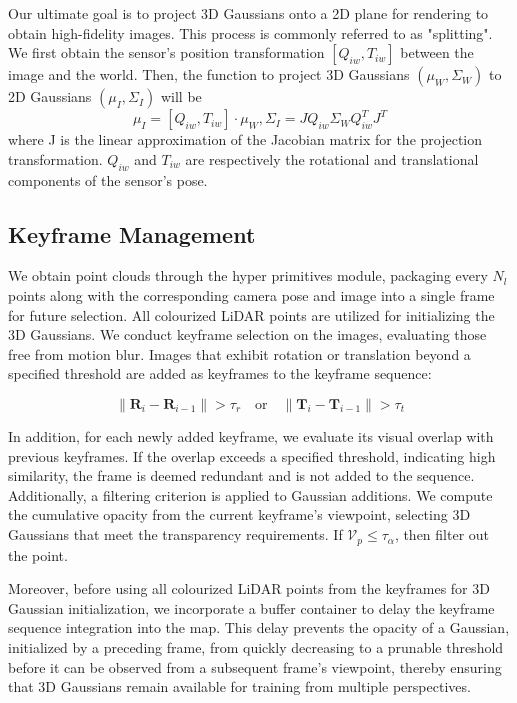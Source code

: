 \documentclass[lettersize,journal]{IEEEtran}
\begin{document}
Our ultimate goal is to project 3D Gaussians onto a 2D plane for rendering to obtain high-fidelity images. This process is commonly referred to as "splitting". We first obtain the sensor's position transformation $[{Q}_{iw},{T}_{iw}]$ between the image and the world. Then, the function to project 3D Gaussians $(\mu_{W},\Sigma_{W})$ to 2D Gaussians $(\mu_{I},\Sigma_{I})$ will be 
\begin{equation}
\mu_{I} =[{Q}_{iw},{T}_{iw}]\cdot\mu_{W}, \Sigma_{I} = J{Q}_{iw}\Sigma_{W}{Q}_{iw}^{T}J^{T} 
\label{eq:muI}
\end{equation}
where J is the linear approximation of the Jacobian matrix for the projection transformation. ${Q}_{iw}$ and ${T}_{iw}$ are respectively the rotational and translational components of the sensor's pose.

\subsection{Keyframe Management}

We obtain point clouds through the hyper primitives module, packaging every $N_l$ points along with the corresponding camera pose and image into a single frame for future selection. All colourized LiDAR points are utilized for initializing the 3D Gaussians. We conduct keyframe selection on the images, evaluating those free from motion blur. Images that exhibit rotation or translation beyond a specified threshold are added as keyframes to the keyframe sequence:

\begin{equation}
\left\lVert \mathbf{R}_i - \mathbf{R}_{i-1} \right\rVert > \tau_r \quad \text{or} \quad \left\lVert \mathbf{T}_i - \mathbf{T}_{i-1} \right\rVert > \tau_t
\label{eq:threshold}
\end{equation}

In addition, for each newly added keyframe, we evaluate its visual overlap with previous keyframes. If the overlap exceeds a specified threshold, indicating high similarity, the frame is deemed redundant and is not added to the sequence. Additionally, a filtering criterion is applied to Gaussian additions. We compute the cumulative opacity from the current keyframe's viewpoint, selecting 3D Gaussians that meet the transparency requirements. If $\mathcal{V}_p \leq \tau_{\alpha}$, then filter out the point. 

Moreover, before using all colourized LiDAR points from the keyframes for 3D Gaussian initialization, we incorporate a buffer container to delay the keyframe sequence integration into the map. This delay prevents the opacity of a Gaussian, initialized by a preceding frame, from quickly decreasing to a prunable threshold before it can be observed from a subsequent frame’s viewpoint, thereby ensuring that 3D Gaussians remain available for training from multiple perspectives.
\end{document}
